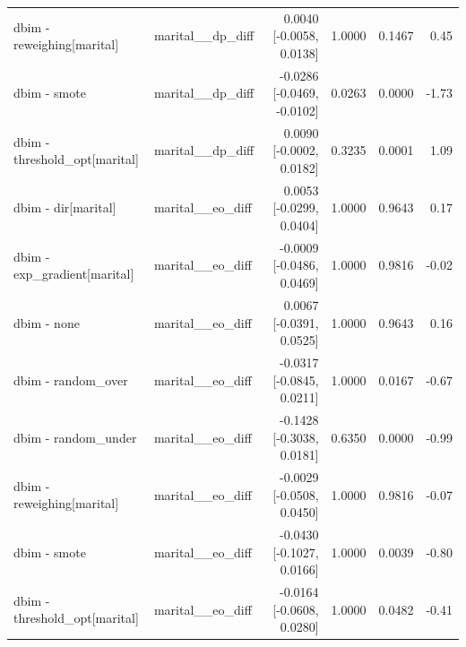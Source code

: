 \begin{table}[t]
{\begin{tabular}{llrrrr}
dbim - reweighing[marital] & marital\_\_dp\_diff & 0.0040 [-0.0058, 0.0138] & 1.0000 & 0.1467 & 0.45 \\
dbim - smote & marital\_\_dp\_diff & -0.0286 [-0.0469, -0.0102] & 0.0263 & 0.0000 & -1.73 \\
dbim - threshold\_opt[marital] & marital\_\_dp\_diff & 0.0090 [-0.0002, 0.0182] & 0.3235 & 0.0001 & 1.09 \\
dbim - dir[marital] & marital\_\_eo\_diff & 0.0053 [-0.0299, 0.0404] & 1.0000 & 0.9643 & 0.17 \\
dbim - exp\_gradient[marital] & marital\_\_eo\_diff & -0.0009 [-0.0486, 0.0469] & 1.0000 & 0.9816 & -0.02 \\
dbim - none & marital\_\_eo\_diff & 0.0067 [-0.0391, 0.0525] & 1.0000 & 0.9643 & 0.16 \\
dbim - random\_over & marital\_\_eo\_diff & -0.0317 [-0.0845, 0.0211] & 1.0000 & 0.0167 & -0.67 \\
dbim - random\_under & marital\_\_eo\_diff & -0.1428 [-0.3038, 0.0181] & 0.6350 & 0.0000 & -0.99 \\
dbim - reweighing[marital] & marital\_\_eo\_diff & -0.0029 [-0.0508, 0.0450] & 1.0000 & 0.9816 & -0.07 \\
dbim - smote & marital\_\_eo\_diff & -0.0430 [-0.1027, 0.0166] & 1.0000 & 0.0039 & -0.80 \\
dbim - threshold\_opt[marital] & marital\_\_eo\_diff & -0.0164 [-0.0608, 0.0280] & 1.0000 & 0.0482 & -0.41 \\
\bottomrule
\end{tabular}}
\end{table}
